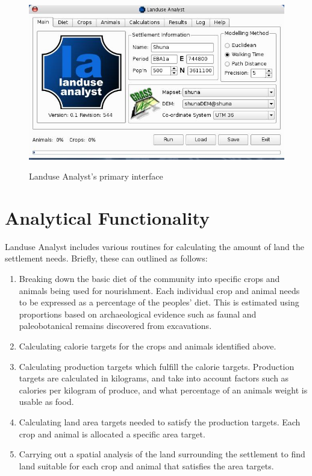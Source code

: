 \begin{figure}[htbp] %
  \includegraphics[scale=0.37]{./images/LanduseAnalyst544.jpg}
   \label{fig:euclideanResults} \caption{Landuse Analyst's primary interface}
   \end{figure}


\section{Analytical Functionality} \label{sec:Analytical Functionality}

Landuse Analyst includes various routines for calculating the amount of land 
the settlement needs.  Briefly, these can outlined as follows:

  \begin{enumerate} 
  \item Breaking down the basic diet of the community into specific crops and
  animals being used for nourishment.  Each individual crop and animal needs to
  be expressed as a percentage of the peoples' diet.  This is estimated using
  proportions based on archaeological evidence such as faunal and
  paleobotanical remains discovered from excavations.  
  \item Calculating  calorie targets for the crops and animals identified above.  
  \item Calculating production targets which fulfill the calorie targets.
  Production targets are calculated in kilograms, and take into account factors such as 
  calories per kilogram of produce, and what percentage of an animals weight is
  usable as food.  
  \item Calculating land area targets needed to satisfy the
  production targets.  Each crop and animal is allocated a specific area
  target.  
  \item Carrying out a spatial analysis of the land surrounding the settlement to
  find land suitable for each crop and animal that satisfies the area targets.  
  \end{enumerate}


